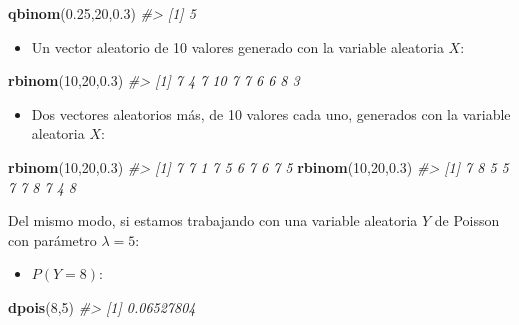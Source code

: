 \documentclass[
]{book}
\newenvironment{Shaded}{\begin{snugshade}}{\end{snugshade}}
\newcommand{\CommentTok}[1]{\textcolor[rgb]{0.56,0.35,0.01}{\textit{#1}}}
\newcommand{\DecValTok}[1]{\textcolor[rgb]{0.00,0.00,0.81}{#1}}
\newcommand{\FloatTok}[1]{\textcolor[rgb]{0.00,0.00,0.81}{#1}}
\newcommand{\KeywordTok}[1]{\textcolor[rgb]{0.13,0.29,0.53}{\textbf{#1}}}
\newcommand{\NormalTok}[1]{#1}
\providecommand{\tightlist}{%
  \setlength{\itemsep}{0pt}\setlength{\parskip}{0pt}}
\theoremstyle{definition}
\theoremstyle{definition}
\theoremstyle{definition}
\theoremstyle{remark}
\begin{document}
\begin{Shaded}
\begin{Highlighting}[]
\KeywordTok{qbinom}\NormalTok{(}\FloatTok{0.25}\NormalTok{,}\DecValTok{20}\NormalTok{,}\FloatTok{0.3}\NormalTok{)  }
\CommentTok{\#\textgreater{} [1] 5}
\end{Highlighting}
\end{Shaded}

\begin{itemize}
\tightlist
\item
  Un vector aleatorio de 10 valores generado con la variable aleatoria \(X\):
\end{itemize}

\begin{Shaded}
\begin{Highlighting}[]
\KeywordTok{rbinom}\NormalTok{(}\DecValTok{10}\NormalTok{,}\DecValTok{20}\NormalTok{,}\FloatTok{0.3}\NormalTok{)}
\CommentTok{\#\textgreater{}  [1]  7  4  7 10  7  7  6  6  8  3}
\end{Highlighting}
\end{Shaded}

\begin{itemize}
\tightlist
\item
  Dos vectores aleatorios más, de 10 valores cada uno, generados con la variable aleatoria \(X\):
\end{itemize}

\begin{Shaded}
\begin{Highlighting}[]
\KeywordTok{rbinom}\NormalTok{(}\DecValTok{10}\NormalTok{,}\DecValTok{20}\NormalTok{,}\FloatTok{0.3}\NormalTok{) }
\CommentTok{\#\textgreater{}  [1] 7 7 1 7 5 6 7 6 7 5}
\KeywordTok{rbinom}\NormalTok{(}\DecValTok{10}\NormalTok{,}\DecValTok{20}\NormalTok{,}\FloatTok{0.3}\NormalTok{)}
\CommentTok{\#\textgreater{}  [1] 7 8 5 5 7 7 8 7 4 8}
\end{Highlighting}
\end{Shaded}

Del mismo modo, si estamos trabajando con una variable aleatoria \(Y\) de Poisson con parámetro \(\lambda=5\):

\begin{itemize}
\tightlist
\item
  \(P(Y=8)\):
\end{itemize}

\begin{Shaded}
\begin{Highlighting}[]
\KeywordTok{dpois}\NormalTok{(}\DecValTok{8}\NormalTok{,}\DecValTok{5}\NormalTok{) }
\CommentTok{\#\textgreater{} [1] 0.06527804}
\end{Highlighting}
\end{Shaded}
\end{document}
